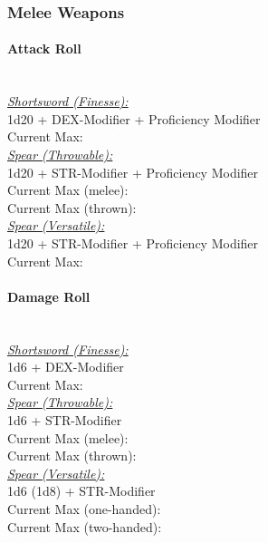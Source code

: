 \documentclass[letterpaper,openany,oneside,twocolumn]{book}
\begin{document}
\subsubsection*{Melee Weapons}
\paragraph*{Attack Roll}\hfill\\
\underline{\textit{Shortsword (Finesse):}}\\
1d20 + DEX-Modifier + Proficiency Modifier\\
\indent Current Max: 
\\
\underline{\textit{Spear (Throwable):}}\\
1d20 + STR-Modifier + Proficiency Modifier\\
\indent Current Max (melee): \\
\indent Current Max (thrown): 
\\
\underline{\textit{Spear (Versatile):}}\\
1d20 + STR-Modifier + Proficiency Modifier\\
\indent Current Max: 
\paragraph*{Damage Roll}\hfill\\
\underline{\textit{Shortsword (Finesse):}}\\
1d6 + DEX-Modifier\\
\indent Current Max: 
\\
\underline{\textit{Spear (Throwable):}}\\
1d6 + STR-Modifier\\
\indent Current Max (melee): \\
\indent Current Max (thrown): 
\\
\underline{\textit{Spear (Versatile):}}\\
1d6 (1d8) + STR-Modifier\\
\indent Current Max (one-handed): \\
\indent Current Max (two-handed): 
\end{document}
